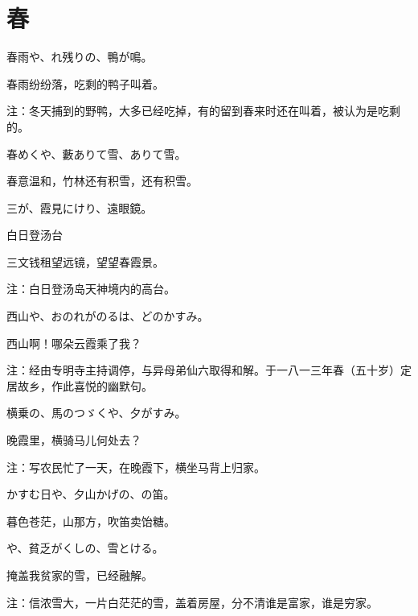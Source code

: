 \section{\FK 春}

\setcounter{haikucounter}{0}

\begin{haiku}
    {\FH 春雨や、れ残りの、鴨が鳴。}

    {\FK 春雨纷纷落，吃剩的鸭子叫着。}

    {\FT 注：冬天捕到的野鸭，大多已经吃掉，有的留到春来时还在叫着，被认为是吃剩的。}
\end{haiku}

\begin{haiku}
    {\FH 春めくや、藪ありて雪、ありて雪。}

    {\FK 春意温和，竹林还有积雪，还有积雪。}
\end{haiku}

\begin{haiku}
    {\FH 三が、霞見にけり、遠眼鏡。}

    {\FK 白日登汤台}

    {\FK 三文钱租望远镜，望望春霞景。}

    {\FT 注：白日登汤岛天神境内的高台。}
\end{haiku}

\begin{haiku}
    {\FH 西山や、おのれがのるは、どのかすみ。}

    {\FK 西山啊！哪朵云霞乘了我？}

    {\FT 注：经由专明寺主持调停，与异母弟仙六取得和解。于一八一三年春（五十岁）定居故乡，作此喜悦的幽默句。}
\end{haiku}

\begin{haiku}
    {\FH 横乗の、馬のつゞくや、夕がすみ。}

    {\FK 晚霞里，横骑马儿何处去？}

    {\FT 注：写农民忙了一天，在晚霞下，横坐马背上归家。}
\end{haiku}

\begin{haiku}
    {\FH かすむ日や、夕山かげの、の笛。}

    {\FK 暮色苍茫，山那方，吹笛卖饴糖。}
\end{haiku}

\begin{haiku}
    {\FH {}や、貧乏がくしの、雪とける。}

    {\FK 掩盖我贫家的雪，已经融解。}

    {\FT 注：信浓雪大，一片白茫茫的雪，盖着房屋，分不清谁是富家，谁是穷家。}
\end{haiku}

